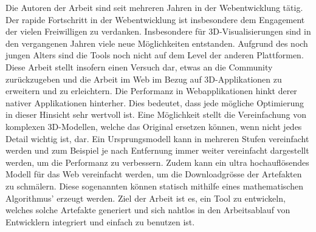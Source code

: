 Die Autoren der Arbeit sind seit mehreren Jahren in der Webentwicklung tätig. Der rapide Fortschritt in der Webentwicklung ist insbesondere dem Engagement der vielen Freiwilligen zu verdanken.
Insbesondere für 3D-Visualisierungen sind in den vergangenen Jahren viele neue Möglichkeiten entstanden. Aufgrund des noch jungen Alters sind die Tools noch nicht auf dem Level der anderen Plattformen. Diese Arbeit stellt insofern einen Versuch dar, etwas an die Community zurückzugeben und die Arbeit im Web im Bezug auf 3D-Applikationen zu erweitern und zu erleichtern.
Die Performanz in Webapplikationen hinkt derer nativer Applikationen hinterher. Dies bedeutet, dass jede mögliche Optimierung in dieser Hinsicht sehr wertvoll ist.
Eine Möglichkeit stellt die Vereinfachung von komplexen 3D-Modellen, welche das Original ersetzen können, wenn nicht jedes Detail wichtig ist, dar.
Ein Ursprungsmodell kann in mehreren Stufen vereinfacht werden und zum Beispiel je nach Entfernung immer weiter vereinfacht dargestellt werden, um die Performanz zu verbessern.
Zudem kann ein ultra hochauflösendes Modell für das Web vereinfacht werden, um die Downloadgrösse der Artefakten zu schmälern.
Diese sogenannten  können statisch mithilfe eines mathematischen Algorithmus' erzeugt werden.
Ziel der Arbeit ist es, ein Tool zu entwickeln, welches solche Artefakte generiert und sich nahtlos in den Arbeitsablauf von Entwicklern integriert und einfach zu benutzen ist.
